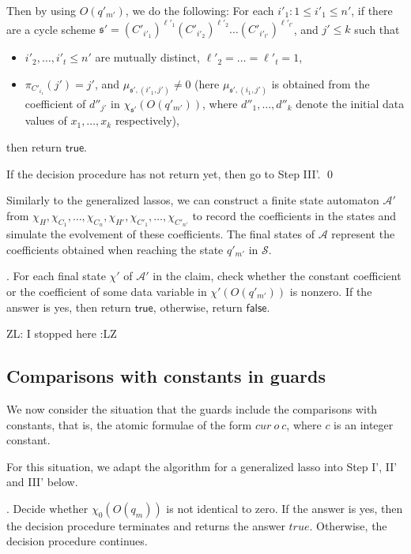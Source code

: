 \documentclass[runningheads,a4paper]{llncs}
\def\Aa{{\mathcal{A} }}
\def\Ss{{\mathcal{S} }}
\def\schm{{\mathfrak{s} }}
\newcommand\ltrue{\mathsf{true}}
\newcommand\lfalse{\mathsf{false}}
\newcommand{\zhilin}[1]{\color{cyan} {ZL: #1 :LZ} \color{black}}
\begin{document}
Then by using $O(q'_{m'})$, we do the following: For each $i'_1: 1 \le i'_1 \le n'$, if there are a cycle scheme $\schm' =(C'_{i'_1})^{\ell'_1} (C'_{i'_2})^{\ell'_2} \dots (C'_{i'_{t'}})^{\ell'_{t'}}$, and $j' \le k$ such that
\begin{itemize}
\item $i'_2,\dots,i'_t \le n'$ are mutually distinct, $\ell'_2 = \dots = \ell'_t = 1$, 
%
\item $\pi_{C'_{i_1}}(j')=j'$, and $\mu_{\schm',(i'_1,j')} \neq 0$ (here $\mu_{\schm',(i_1,j')}$ is obtained from the coefficient of $d''_{j'}$ in  $\chi_{\schm'}(O(q'_{m'}))$, where $d''_1,\dots,d''_k$ denote the initial data values of $x_1,\dots,x_k$ respectively),
\end{itemize}
then return $\ltrue$. 

If the decision procedure has not return yet, then go to Step III'. \qed

\smallskip

Similarly to the generalized lassos, we can construct a finite state automaton $\Aa'$ from $\chi_H,\chi_{C_1},\dots,\chi_{C_n},\chi_{H'}, \chi_{C'_1},\dots,\chi_{C'_{n'}}$ to record the coefficients in the states and simulate the evolvement of these coefficients. The final states of $\Aa$ represent the coefficients obtained when reaching the state $q'_{m'}$ in $\Ss$. 

\smallskip 

. For each final state $\chi'$ of $\Aa'$ in the claim, check whether the constant coefficient or the coefficient of some data variable in $\chi'(O(q'_{m'}))$ is nonzero. If the answer is yes, then return $\ltrue$, otherwise, return $\lfalse$.

\zhilin{I stopped here}

\subsection{Comparisons with constants in guards}

We now consider the situation that the guards include the comparisons with constants, that is, the atomic formulae of the form $cur\ o\ c$, where $c$ is an integer constant. 

For this situation, we adapt the algorithm for a generalized lasso into Step I', II' and III' below.

\smallskip

. Decide whether $\chi_0(O(q_m))$ is not identical to zero. If the answer is yes, then the decision procedure terminates and returns the answer $true$. Otherwise, the decision procedure continues.
\end{document}
